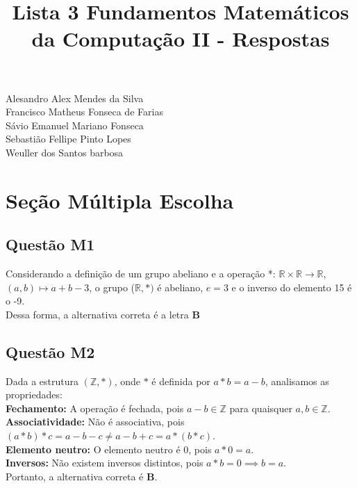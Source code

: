 \documentclass{article}
\title{Lista 3 Fundamentos Matemáticos da Computação II - Respostas}
\begin{document}
\maketitle

\begin{center}
Alesandro Alex Mendes da Silva \\
Francisco Matheus Fonseca de Farias \\
Sávio Emanuel Mariano Fonseca \\
Sebastião Fellipe Pinto Lopes \\
Weuller dos Santos barbosa \\
\end{center}


\section{Seção Múltipla Escolha}

\subsection{Questão M1} 
Considerando a definição de um grupo abeliano e a operação
*: $\mathbb{R}\times\mathbb{R} \xrightarrow{} \mathbb{R}$, $(a,b) \mapsto a+b-3$, o grupo ($\mathbb{R},*)$ é abeliano, $e=3$ e o inverso do elemento 15 é o -9. \\

Dessa forma, a alternativa correta é a letra \textbf{B}


\subsection{Questão M2}
Dada a estrutura $(\mathbb{Z}, \ast)$, onde $\ast$ é definida por $a \ast b = a - b$, analisamos as propriedades:\\
\textbf{Fechamento:}  
A operação é fechada, pois $a - b \in \mathbb{Z}$ para quaisquer $a, b \in \mathbb{Z}$.\\
\textbf{Associatividade:}  
Não é associativa, pois $(a \ast b) \ast c = a - b - c \neq a - b + c = a \ast (b \ast c)$.\\
\textbf{Elemento neutro:}  
O elemento neutro é $0$, pois $a \ast 0 = a$.\\
\textbf{Inversos:}  
Não existem inversos distintos, pois $a \ast b = 0 \implies b = a$.\\

Portanto, a alternativa correta é \textbf{B}.
\end{document}
